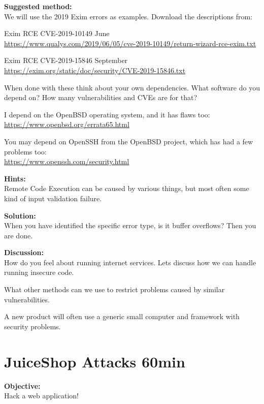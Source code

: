 \documentclass[a4paper,11pt,notitlepage]{report}
\begin{document}
{\bf Suggested method:}\\
We will use the 2019 Exim errors as examples. Download the descriptions from:
\begin{list2}
\item Exim RCE CVE-2019-10149 June\\ \url{https://www.qualys.com/2019/06/05/cve-2019-10149/return-wizard-rce-exim.txt}

\item Exim RCE CVE-2019-15846 September\\
\url{https://exim.org/static/doc/security/CVE-2019-15846.txt}
\end{list2}

When done with these think about your own dependencies. What software do you depend on? How many vulnerabilities and CVEs are for that?

I depend on the OpenBSD operating system, and it has flaws too:\\
\url{https://www.openbsd.org/errata65.html}

You may depend on OpenSSH from the OpenBSD project, which has had a few problems too:\\
\url{https://www.openssh.com/security.html}

{\bf Hints:}\\
Remote Code Execution can be caused by various things, but most often some kind of input validation failure.

{\bf Solution:}\\
When you have identified the specific error type, is it buffer overflows? Then you are done.

{\bf Discussion:}\\
How do you feel about running internet services. Lets discuss how we can handle running insecure code.

What other methods can we use to restrict problems caused by similar vulnerabilities.

A new product will often use a generic small computer and framework with security problems.

\chapter{JuiceShop Attacks 60min}
\label{ex:juiceshop-attack}


 {\bf Objective:}\\
Hack a web application!
\end{document}
